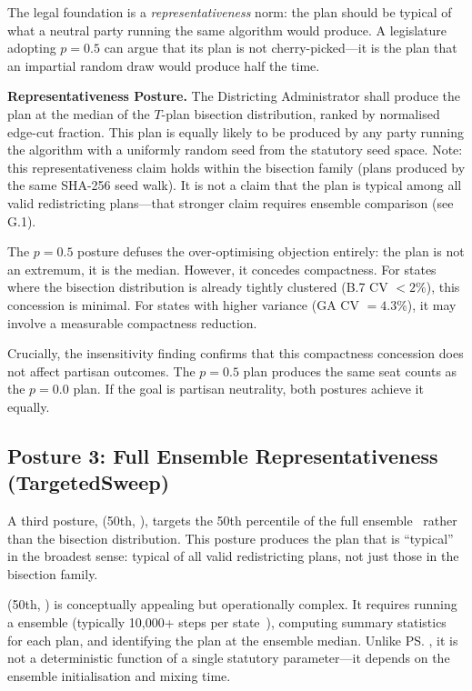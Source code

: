 The legal foundation is a \emph{representativeness} norm: the plan should
be typical of what a neutral party running the same algorithm would produce.
A legislature adopting $p = 0.5$ can argue that its plan is not
cherry-picked---it is the plan that an impartial random draw would produce
half the time.

\begin{statute}
\textbf{Representativeness Posture.}
The Districting Administrator shall produce the plan at the median of the
$T$-plan bisection distribution, ranked by normalised edge-cut fraction.
This plan is equally likely to be produced by any party running the
algorithm with a uniformly random seed from the statutory seed space.
Note: this representativeness claim holds within the bisection family
(plans produced by the same SHA-256 seed walk).
It is not a claim that the plan is typical among all valid redistricting
plans---that stronger claim requires ensemble comparison (see G.1).
\end{statute}

The $p = 0.5$ posture defuses the over-optimising objection entirely: the
plan is not an extremum, it is the median.
However, it concedes compactness.
For states where the bisection distribution is already tightly clustered
(B.7 CV $< 2\%$), this concession is minimal.
For states with higher variance (GA CV $= 4.3\%$), it may involve a
measurable compactness reduction.

Crucially, the insensitivity finding confirms that this compactness concession
does not affect partisan outcomes.
The $p = 0.5$ plan produces the same seat counts as the $p = 0.0$ plan.
If the goal is partisan neutrality, both postures achieve it equally.

\subsection{Posture 3: Full Ensemble Representativeness (TargetedSweep)}

A third posture, \ts{}(50th, \recom{}), targets the 50th percentile of the
full \recom{} ensemble~\citep{deford2021} rather than the bisection
distribution.
This posture produces the plan that is ``typical'' in the broadest sense:
typical of all valid redistricting plans, not just those in the bisection
family.

\ts{}(50th, \recom{}) is conceptually appealing but operationally complex.
It requires running a \gc{} \recom{} ensemble (typically 10,000+ steps per
state~\citep{herschlag2020,fifield2020}), computing summary statistics for
each plan, and identifying the plan at the ensemble median.
Unlike \ps{}, it is not a deterministic function of a single statutory
parameter---it depends on the ensemble initialisation and mixing time.

